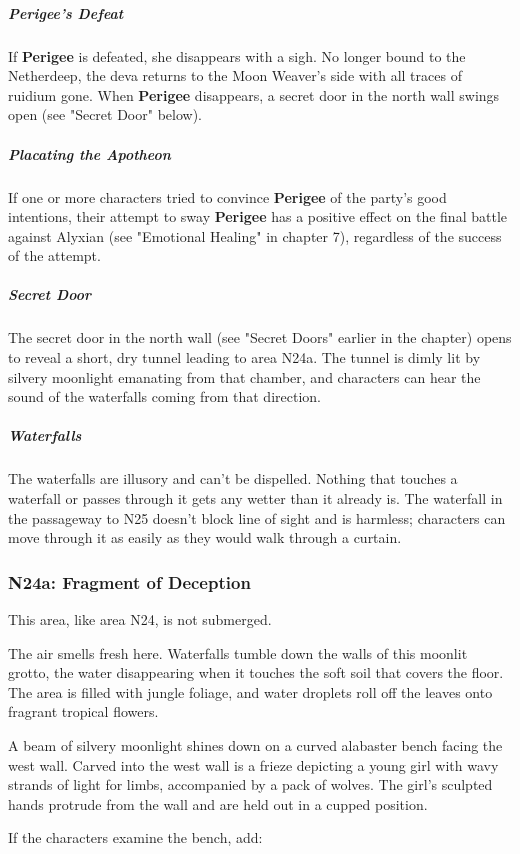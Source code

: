 \documentclass[10pt,a4paper,twoside,bg=print,twocolumn,openany,nodeprecatedcode]{dndbook}
\begin{document}
\subparagraph{Perigee's Defeat}
If \textbf{Perigee} is defeated, she disappears with a sigh. No longer bound to the Netherdeep, the deva returns to the Moon Weaver's side with all traces of ruidium gone. When \textbf{Perigee} disappears, a secret door in the north wall swings open (see "Secret Door" below).

\subparagraph{Placating the Apotheon}
If one or more characters tried to convince \textbf{Perigee} of the party's good intentions, their attempt to sway \textbf{Perigee} has a positive effect on the final battle against Alyxian (see "Emotional Healing" in chapter 7), regardless of the success of the attempt.

\subparagraph{Secret Door}
The secret door in the north wall (see "Secret Doors" earlier in the chapter) opens to reveal a short, dry tunnel leading to area N24a. The tunnel is dimly lit by silvery moonlight emanating from that chamber, and characters can hear the sound of the waterfalls coming from that direction.

\subparagraph{Waterfalls}
The waterfalls are illusory and can't be dispelled. Nothing that touches a waterfall or passes through it gets any wetter than it already is. The waterfall in the passageway to N25 doesn't block line of sight and is harmless; characters can move through it as easily as they would walk through a curtain.

\subsubsection{N24a: Fragment of Deception}
This area, like area N24, is not submerged.

\begin{DndReadAloud}{}
The air smells fresh here. Waterfalls tumble down the walls of this moonlit grotto, the water disappearing when it touches the soft soil that covers the floor. The area is filled with jungle foliage, and water droplets roll off the leaves onto fragrant tropical flowers.

A beam of silvery moonlight shines down on a curved alabaster bench facing the west wall. Carved into the west wall is a frieze depicting a young girl with wavy strands of light for limbs, accompanied by a pack of wolves. The girl's sculpted hands protrude from the wall and are held out in a cupped position.

\end{DndReadAloud}

If the characters examine the bench, add:
\end{document}

